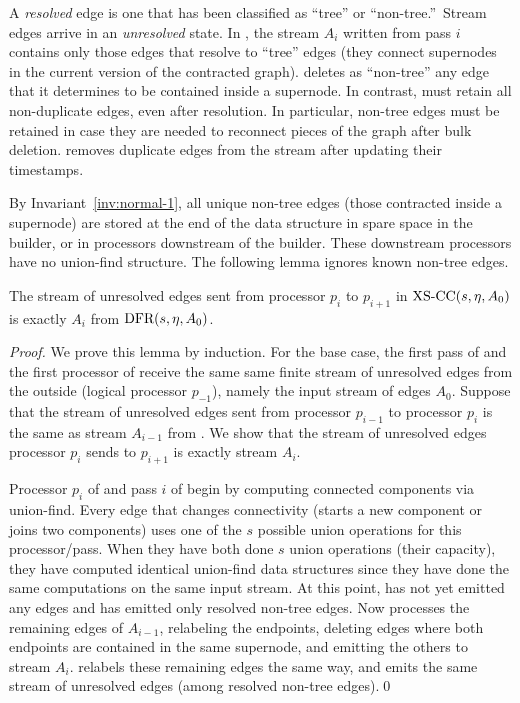 A \emph{resolved} edge is one that has been classified as ``tree''
or ``non-tree.''\ Stream edges arrive
in an \emph{unresolved} state. 
In \DFRns, the stream $A_i$ written from pass $i$ contains only those edges that resolve to ``tree'' edges
(they connect supernodes in the current version of the contracted graph).  \DFR deletes as ``non-tree'' any edge that it determines to be contained inside a supernode.  
In contrast, \XSCC must retain all non-duplicate edges,
even after resolution.  In particular, non-tree edges
must be retained in case they are needed to reconnect pieces of the 
graph after bulk deletion. 
\XSCC removes duplicate edges from the stream after updating their 
timestamps.

By Invariant~\ref{inv:normal-1}, all unique non-tree edges (those contracted inside a supernode) are stored at the end of the \XSCC data structure in spare space in the builder, or in processors downstream of the builder. These downstream
processors have no
union-find structure. The following lemma ignores known non-tree edges.

\begin{lemma}
The stream of unresolved edges sent from processor $p_i$ to $p_{i+1}$ in 
$\mbox{XS-CC}(s,\eta,A_0)$ is exactly $A_i$ from
$\mbox{DFR}(s,\eta,A_0)$.
\label{lem:A-stream}
\end{lemma}

\begin{proof}
We prove this lemma by induction.  For the base case, the first pass of \DFR and the first processor of \XSCC receive the same same finite stream of unresolved edges from the outside (logical processor $p_{-1}$), namely the input stream of edges $A_0$. Suppose that the stream of unresolved edges sent from processor $p_{i-1}$ to processor $p_i$ is the same as stream $A_{i-1}$ from \DFR.  We show that the stream of unresolved edges processor $p_i$ sends to $p_{i+1}$ is exactly \DFR stream $A_i$.

Processor $p_i$ of \XSCC and pass $i$ of \DFR begin by computing connected components via union-find.  Every edge that changes connectivity (starts a new component or joins two components) uses one of the $s$ possible union operations for this processor/pass. When they have both done $s$ union operations (their capacity), they have computed identical union-find data structures since they have done the same computations on the same input stream.  At this point, \DFR has not yet emitted any edges and \XSCC has emitted only resolved non-tree edges. Now \DFR processes the remaining edges of $A_{i-1}$, relabeling the endpoints, deleting edges where both endpoints are contained in the same supernode, and emitting the others to stream $A_i$. \XSCC relabels these remaining edges the same way, and emits the same stream of unresolved edges (among resolved non-tree edges).\qed
\end{proof}

